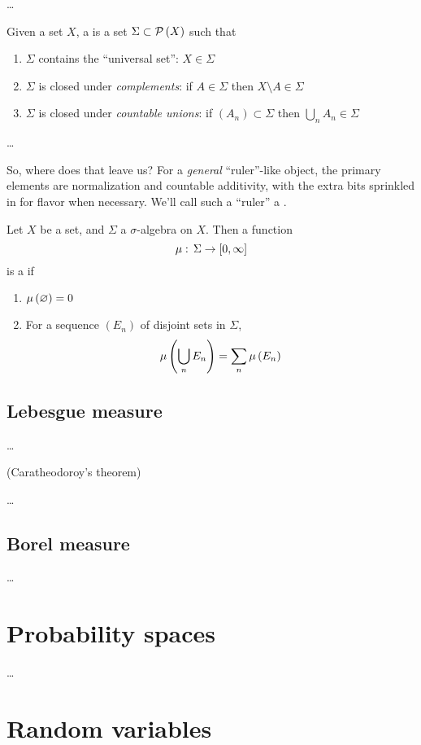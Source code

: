 \ldots

\begin{definition}
Given a set $X$, a  is a set $\Sigma \subset \mathcal{P}\left( X \right)$ such that
\begin{enumerate}
    \item $\Sigma$ contains the ``universal set'': $X \in \Sigma$
    \item $\Sigma$ is closed under \emph{complements}: if $A \in \Sigma$ then $X \setminus A \in \Sigma$
    \item $\Sigma$ is closed under \emph{countable unions}: if $(A_n) \subset \Sigma$ then $\bigcup_n A_n \in \Sigma$
\end{enumerate}
\end{definition}

\ldots

So, where does that leave us? For a \emph{general} ``ruler''-like object, the primary elements are normalization and countable additivity, with the extra bits sprinkled in for flavor when necessary. We'll call such a ``ruler'' a .

\begin{definition}[Measure]
Let $X$ be a set, and $\Sigma$ a $\sigma$-algebra on $X$. Then a function
\[ \mu: \, \Sigma \to [0,\infty] \]
is a  if
\begin{enumerate}
    \item $\mu\left( \varnothing \right) = 0$
    \item For a sequence $(E_n)$ of disjoint sets in $\Sigma$,
    \[ \mu\left( \bigcup_n E_n \right) = \sum_n \mu\left( E_n \right) \]
\end{enumerate}
\end{definition}

\subsection{Lebesgue measure}

\ldots

(Caratheodoroy's theorem)

\ldots

\subsection{Borel measure}

\ldots

\section{Probability spaces}

\ldots

\section{Random variables}

